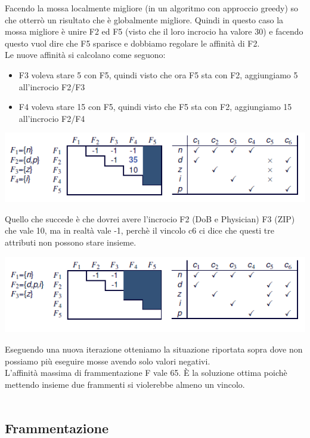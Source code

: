 Facendo la mossa localmente migliore (in un algoritmo con approccio greedy) so che otterrò un risultato che è globalmente migliore. Quindi in questo caso la mossa migliore è unire F2 ed F5 (visto che il loro incrocio ha valore 30) e facendo questo vuol dire che F5 sparisce e dobbiamo regolare le affinità di F2.\\
Le nuove affinità si calcolano come seguono:
\begin{itemize}
    \item F3 voleva stare 5 con F5, quindi visto che ora F5 sta con F2, aggiungiamo 5 all'incrocio F2/F3
    \item F4 voleva stare 15 con F5, quindi visto che F5 sta con F2, aggiungiamo 15 all'incrocio F2/F4
\end{itemize}
\begin{center}
    \includegraphics[scale=0.7]{img/maxaff3.png}
\end{center}
Quello che succede è che dovrei avere l'incrocio F2 (DoB e Physician) F3 (ZIP) che vale 10, ma in realtà vale -1, perchè il vincolo c6 ci dice che questi tre attributi non possono stare insieme.
\begin{center}
    \includegraphics[scale=0.7]{img/maxaff4.png}
\end{center}
Eseguendo una nuova iterazione otteniamo la situazione riportata sopra dove non possiamo più eseguire mosse avendo solo valori negativi.\\
L'affinità massima di frammentazione F vale 65.
È la soluzione ottima poichè mettendo insieme due frammenti si violerebbe almeno un vincolo.\\\\


\subsection{Frammentazione}
